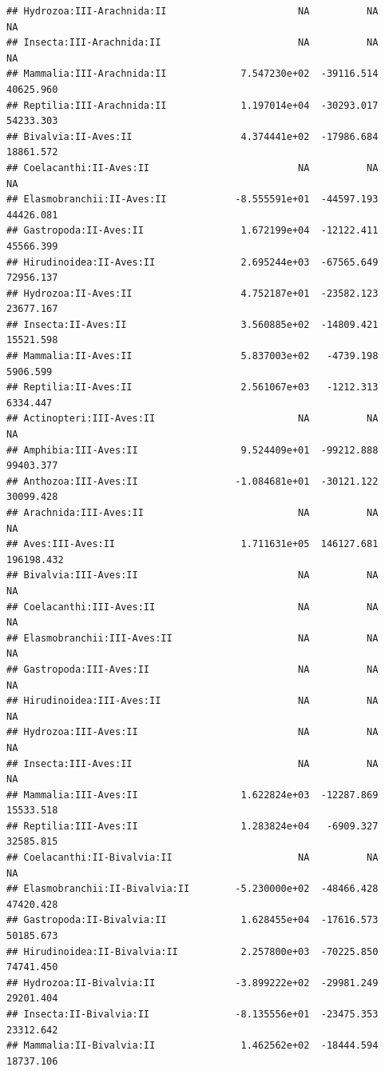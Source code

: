 \documentclass[
  12pt,
]{article}
\begin{document}
\begin{verbatim}
## Hydrozoa:III-Arachnida:II                       NA          NA          NA
## Insecta:III-Arachnida:II                        NA          NA          NA
## Mammalia:III-Arachnida:II             7.547230e+02  -39116.514   40625.960
## Reptilia:III-Arachnida:II             1.197014e+04  -30293.017   54233.303
## Bivalvia:II-Aves:II                   4.374441e+02  -17986.684   18861.572
## Coelacanthi:II-Aves:II                          NA          NA          NA
## Elasmobranchii:II-Aves:II            -8.555591e+01  -44597.193   44426.081
## Gastropoda:II-Aves:II                 1.672199e+04  -12122.411   45566.399
## Hirudinoidea:II-Aves:II               2.695244e+03  -67565.649   72956.137
## Hydrozoa:II-Aves:II                   4.752187e+01  -23582.123   23677.167
## Insecta:II-Aves:II                    3.560885e+02  -14809.421   15521.598
## Mammalia:II-Aves:II                   5.837003e+02   -4739.198    5906.599
## Reptilia:II-Aves:II                   2.561067e+03   -1212.313    6334.447
## Actinopteri:III-Aves:II                         NA          NA          NA
## Amphibia:III-Aves:II                  9.524409e+01  -99212.888   99403.377
## Anthozoa:III-Aves:II                 -1.084681e+01  -30121.122   30099.428
## Arachnida:III-Aves:II                           NA          NA          NA
## Aves:III-Aves:II                      1.711631e+05  146127.681  196198.432
## Bivalvia:III-Aves:II                            NA          NA          NA
## Coelacanthi:III-Aves:II                         NA          NA          NA
## Elasmobranchii:III-Aves:II                      NA          NA          NA
## Gastropoda:III-Aves:II                          NA          NA          NA
## Hirudinoidea:III-Aves:II                        NA          NA          NA
## Hydrozoa:III-Aves:II                            NA          NA          NA
## Insecta:III-Aves:II                             NA          NA          NA
## Mammalia:III-Aves:II                  1.622824e+03  -12287.869   15533.518
## Reptilia:III-Aves:II                  1.283824e+04   -6909.327   32585.815
## Coelacanthi:II-Bivalvia:II                      NA          NA          NA
## Elasmobranchii:II-Bivalvia:II        -5.230000e+02  -48466.428   47420.428
## Gastropoda:II-Bivalvia:II             1.628455e+04  -17616.573   50185.673
## Hirudinoidea:II-Bivalvia:II           2.257800e+03  -70225.850   74741.450
## Hydrozoa:II-Bivalvia:II              -3.899222e+02  -29981.249   29201.404
## Insecta:II-Bivalvia:II               -8.135556e+01  -23475.353   23312.642
## Mammalia:II-Bivalvia:II               1.462562e+02  -18444.594   18737.106

\end{verbatim}
\end{document}
